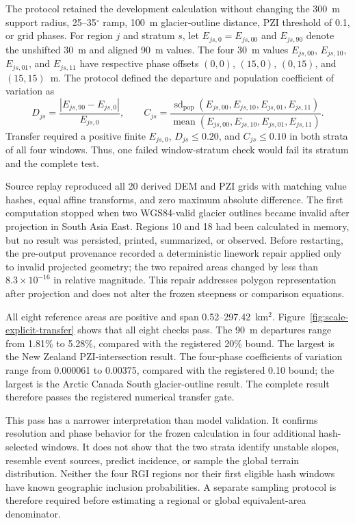 \documentclass[11pt]{article}
\begin{document}
The protocol retained the development calculation without changing the
300~m support radius, 25--35$^\circ$ ramp, 100~m glacier-outline distance,
PZI threshold of 0.1, or grid phases. For region $j$ and stratum $s$, let
$E_{js,0}=E_{js,00}$ and $E_{js,90}$ denote the unshifted 30~m and aligned
90~m values.
The four 30~m values $E_{js,00}$, $E_{js,10}$, $E_{js,01}$, and $E_{js,11}$
have respective phase offsets $(0,0)$, $(15,0)$, $(0,15)$, and $(15,15)$~m.
The protocol defined the departure and population coefficient of variation as
\begin{equation}
 D_{js}=\frac{|E_{js,90}-E_{js,0}|}{E_{js,0}},\qquad
 C_{js}=\frac{\operatorname{sd}_{\mathrm{pop}}
 (E_{js,00},E_{js,10},E_{js,01},E_{js,11})}
 {\operatorname{mean}(E_{js,00},E_{js,10},E_{js,01},E_{js,11})}.
\end{equation}
Transfer required a positive finite $E_{js,0}$, $D_{js}\leq0.20$, and
$C_{js}\leq0.10$ in both strata of all four windows. Thus, one
failed window-stratum check would fail its stratum and the complete test.

Source replay reproduced all 20 derived DEM and PZI grids with matching value
hashes, equal affine transforms, and zero maximum absolute difference. The
first computation stopped when two WGS84-valid
glacier outlines became invalid after projection in South Asia East. Regions
10 and 18 had been calculated in memory, but no result was persisted, printed,
summarized, or observed. Before restarting, the pre-output provenance recorded
a deterministic linework repair applied only to invalid projected geometry; the
two repaired areas changed by less than $8.3\times10^{-16}$ in relative
magnitude. This repair addresses polygon representation after projection and
does not alter the frozen steepness or comparison equations.

All eight reference areas are positive and span 0.52--297.42~km$^2$.
Figure~\ref{fig:scale-explicit-transfer} shows that all eight checks pass.
The 90~m departures range from 1.81\% to 5.28\%, compared with the registered
20\% bound. The largest is the New Zealand PZI-intersection result. The
four-phase coefficients of variation range from 0.000061 to 0.00375, compared
with the registered 0.10 bound; the largest is the Arctic Canada South
glacier-outline result. The complete result therefore passes the registered
numerical transfer gate.

This pass has a narrower interpretation than model validation. It confirms
resolution and phase behavior for the frozen calculation in four additional
hash-selected windows. It does not show that the two strata identify unstable
slopes, resemble event sources, predict incidence, or sample the global terrain
distribution. Neither the four RGI regions nor their first eligible hash
windows have known geographic inclusion probabilities. A separate sampling
protocol is therefore required before estimating a regional or global
equivalent-area denominator.
\end{document}
